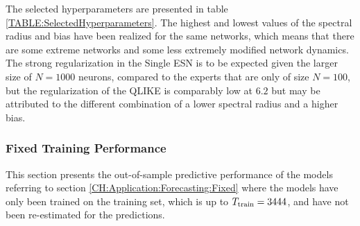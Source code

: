 The selected hyperparameters are presented in table \ref{TABLE:SelectedHyperparameters}. The highest and lowest values of the spectral radius and bias have been realized for the same networks, which means that there are some extreme networks and some less extremely modified network dynamics. The strong regularization in the Single ESN is to be expected given the larger size of $N = 1000$ neurons, compared to the experts that are only of size $N=100$, but the regularization of the QLIKE is comparably low at $6.2$ but may be attributed to the different combination of a lower spectral radius and a higher bias.




\subsubsection{Fixed Training Performance}
\label{CH:EmpiricalResults:Fixed}

This section presents the out-of-sample predictive performance of the models referring to section \ref{CH:Application:Forecasting:Fixed} where the models have only been trained on the training set, which is up to $T_{\text{train}} = 3444$, and have not been re-estimated for the predictions.

